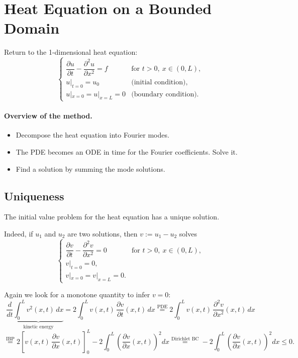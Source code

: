 

\section{Heat Equation on a Bounded Domain}

Return to the 1-dimensional heat equation:
\[
\begin{cases}
\dfrac{\partial u}{\partial t} - \dfrac{\partial^2 u}{\partial x^2} = f & \text{for } t > 0,\ x \in (0, L), \\[2pt]
u|_{t=0} = u_0 & \text{(initial condition),} \\[2pt]
u|_{x=0} = u|_{x=L} = 0 & \text{(boundary condition).}
\end{cases}
\]

\paragraph{Overview of the method.}
\begin{itemize}
\item Decompose the heat equation into Fourier modes.
\item The PDE becomes an ODE in time for the Fourier coefficients. Solve it.
\item Find a solution by summing the mode solutions.
\end{itemize}

\subsection{Uniqueness}

The initial value problem for the heat equation has a unique solution.

Indeed, if $u_1$ and $u_2$ are two solutions, then $v := u_1 - u_2$ solves
\[
\begin{cases}
\dfrac{\partial v}{\partial t} - \dfrac{\partial^2 v}{\partial x^2} = 0 & \text{for } t > 0,\ x \in (0, L), \\[2pt]
v|_{t=0} = 0, \\[2pt]
v|_{x=0} = v|_{x=L} = 0.
\end{cases}
\]

Again we look for a monotone quantity to infer $v = 0$:
\[
\frac{d}{dt}\underbrace{\int_0^L v^2(x, t)\,dx}_{\text{kinetic energy}}
= 2\int_0^L v(x, t)\,\frac{\partial v}{\partial t}(x, t)\,dx
\overset{\text{PDE}}{=} 2\int_0^L v(x, t)\,\frac{\partial^2 v}{\partial x^2}(x, t)\,dx
\]
\[
\overset{\text{IBP}}{=} 2\left[v(x, t)\,\frac{\partial v}{\partial x}(x, t)\right]_0^L - 2\int_0^L \left(\frac{\partial v}{\partial x}(x, t)\right)^2 dx
\overset{\text{Dirichlet BC}}{=} -2\int_0^L \left(\frac{\partial v}{\partial x}(x, t)\right)^2 dx \leq 0.
\]

